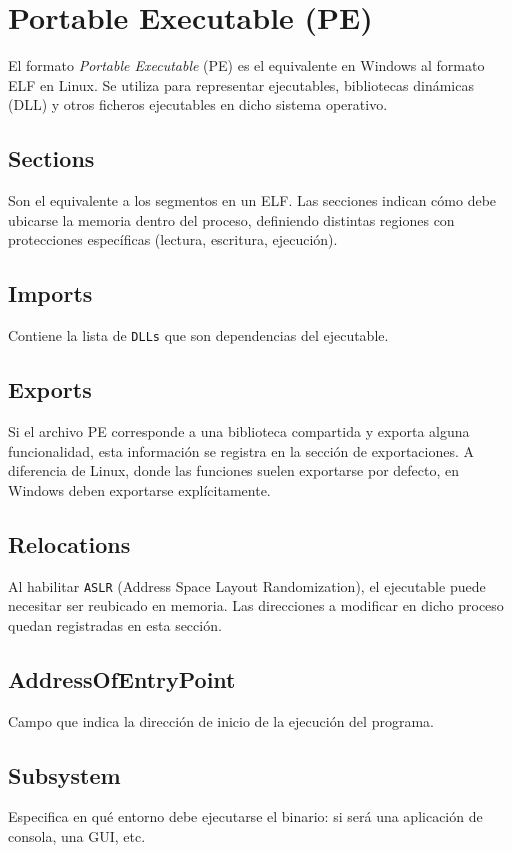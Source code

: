 \section{Portable Executable (PE)}

El formato \textit{Portable Executable} (PE) es el equivalente en Windows al formato ELF en Linux. 
Se utiliza para representar ejecutables, bibliotecas dinámicas (DLL) y otros ficheros ejecutables en dicho sistema operativo.

\subsection{Sections}
Son el equivalente a los segmentos en un ELF.  
Las secciones indican cómo debe ubicarse la memoria dentro del proceso, 
definiendo distintas regiones con protecciones específicas (lectura, escritura, ejecución).

\subsection{Imports}
Contiene la lista de \texttt{DLLs} que son dependencias del ejecutable.

\subsection{Exports}
Si el archivo PE corresponde a una biblioteca compartida y exporta alguna funcionalidad, 
esta información se registra en la sección de exportaciones.  
A diferencia de Linux, donde las funciones suelen exportarse por defecto, 
en Windows deben exportarse explícitamente.

\subsection{Relocations}
Al habilitar \texttt{ASLR} (Address Space Layout Randomization), 
el ejecutable puede necesitar ser reubicado en memoria.  
Las direcciones a modificar en dicho proceso quedan registradas en esta sección.

\subsection{AddressOfEntryPoint}
Campo que indica la dirección de inicio de la ejecución del programa.

\subsection{Subsystem}
Especifica en qué entorno debe ejecutarse el binario:  
si será una aplicación de consola, una GUI, etc.

